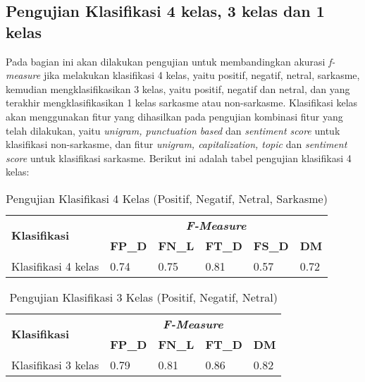 \subsection{Pengujian Klasifikasi 4 kelas, 3 kelas dan 1 kelas}
Pada bagian ini akan dilakukan pengujian untuk membandingkan akurasi \textit{f-measure }jika melakukan klasifikasi 4 kelas, yaitu positif, negatif, netral, sarkasme, kemudian mengklasifikasikan 3 kelas, yaitu positif, negatif dan netral, dan yang terakhir mengklasifikasikan 1 kelas sarkasme atau non-sarkasme. Klasifikasi kelas akan menggunakan fitur yang dihasilkan pada pengujian kombinasi fitur yang telah 
dilakukan, yaitu \textit{unigram, punctuation based} dan \textit{sentiment score }untuk klasifikasi non-sarkasme, dan fitur \textit{unigram, capitalization, topic }dan \textit{sentiment score} untuk klasifikasi sarkasme. Berikut ini adalah tabel pengujian klasifikasi 4 kelas:

\begin{table}[H]
	\caption{Pengujian Klasifikasi 4 Kelas (Positif, Negatif, Netral, Sarkasme)}
	\centering
	\small
	\begin{adjustbox}{width=1\textwidth}
	\begin{tabular}{|p{5.3cm}|p{1.2cm}|p{1.2cm}|p{1.2cm}|p{1.2cm}|p{1.2cm}|}
		\hline
		\multirow{2}{*}{\textbf{Klasifikasi}} & \multicolumn{5}{c|}{\textit{\textbf{F-Measure}}} \\
		\cline{2-6}
		& \textbf{FP\_D} & \textbf{FN\_L} & \textbf{FT\_D} & \textbf{FS\_D} & \textbf{DM} \\
		\hline
		Klasifikasi 4 kelas & 0.74 & 0.75 & 0.81 & 0.57 & 0.72 \\
		\hline
	\end{tabular}
	\end{adjustbox}
\end{table}

\begin{table}[H]
	\caption{Pengujian Klasifikasi 3 Kelas (Positif, Negatif, Netral)}
	\centering
	\small
	\begin{adjustbox}{width=1\textwidth}
	\begin{tabular}{|p{5.6cm}|p{1.5cm}|p{1.5cm}|p{1.5cm}|p{1.5cm}|}
		\hline
		\multirow{2}{*}{\textbf{Klasifikasi}} & \multicolumn{4}{c|}{\textit{\textbf{F-Measure}}} \\
		\cline{2-5}
		& \textbf{FP\_D} & \textbf{FN\_L} & \textbf{FT\_D} & \textbf{DM} \\
		\hline
		Klasifikasi 3 kelas & 0.79 & 0.81 & 0.86 & 0.82 \\
		\hline
	\end{tabular}
	\end{adjustbox}
\end{table}

